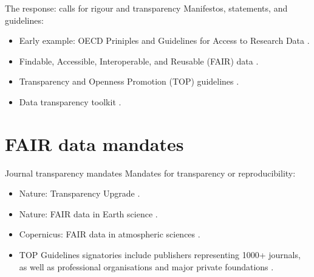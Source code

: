 \documentclass[aspectratio=169, 11pt]{beamer} %
\begin{document}
\begin{frame}{The response: calls for rigour and transparency}
  Manifestos, statements, and guidelines:
    \begin{itemize}[label=\textbullet]
        \item Early example: OECD Priniples and Guidelines for Access to Research Data \cite{Oecd2007-vi}.
        \item Findable, Accessible, Interoperable, and Reusable (FAIR) data \cite{Wilkinson2016-mr, Go-fair2017-vs}.
        \item Transparency and Openness Promotion (TOP) guidelines \cite{Nosek2015-wm, Cos2019-mr}.
        \item Data transparency toolkit \cite{Perkel2018-rw}.
    \end{itemize}
\end{frame}

\section{FAIR data mandates}

\begin{frame}{Journal transparency mandates}
  Mandates for transparency or reproducibility:
    \begin{itemize}[label=\textbullet]
        \item Nature: Transparency Upgrade \cite{Nature2017-lq}.
        \item Nature: FAIR data in Earth science \cite{Nature2019-ng}.
        \item Copernicus: FAIR data in atmospheric sciences \cite{Van_Edig2018-bu}.
        \item TOP Guidelines signatories include publishers representing 1000+ journals, as well as professional organisations and major private foundations  \cite{Cos2019-mr}.
    \end{itemize}
\end{frame}

\end{document}
